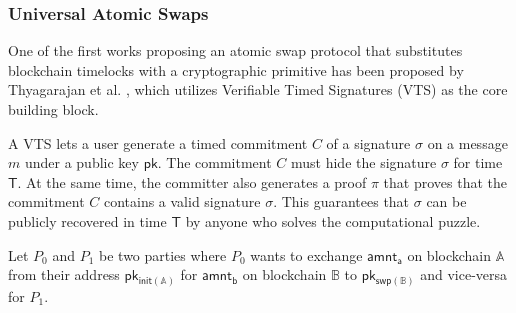 \documentclass{article}      	%
\begin{document}
%

\subsubsection{Universal Atomic Swaps}

One of the first works proposing an atomic swap protocol that substitutes blockchain timelocks with a cryptographic primitive has been proposed by Thyagarajan et al. \cite{uas}, which utilizes Verifiable Timed Signatures (VTS) \cite{vts} as the core building block.

A VTS lets a user generate a timed commitment $C$ of a signature $\sigma$ on a message $m$ under a public key $\mathsf{pk}$. The commitment $C $ must hide the signature $\sigma$ for time $\mathsf{T}$. At the same time, the committer also generates a proof $\pi$ that proves that the commitment $C$ contains a valid signature $\sigma$. This guarantees that $\sigma$ can be publicly recovered in time $\mathsf{T}$ by anyone who solves the computational puzzle.

Let $P_0$ and $P_1$ be two parties where $P_0$ wants to exchange $\mathsf{amnt_a}$ on blockchain $\mathbb{A}$ from their address $\mathsf{pk_{init(\mathbb{A})}}$ for $\mathsf{amnt_b}$ on blockchain $\mathbb{B}$ to $\mathsf{pk_{swp(\mathbb{B})}}$ and vice-versa for $P_1$.
\end{document}
